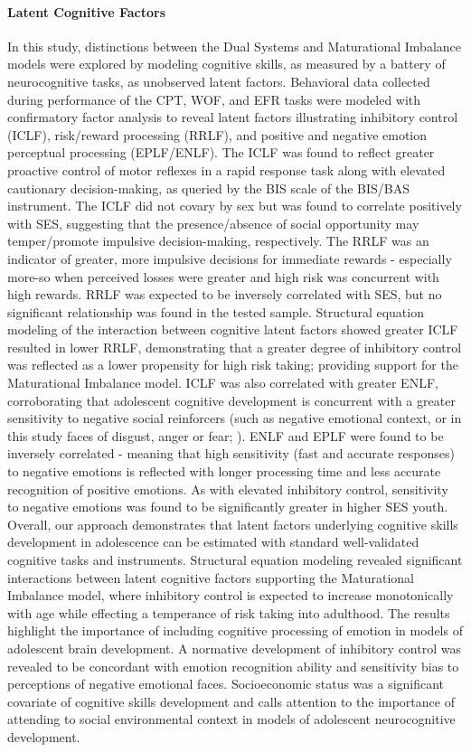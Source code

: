 \documentclass[utf8]{stylesheet}
\begin{document}
\paragraph*{Latent Cognitive Factors} In this study, distinctions between the Dual Systems and Maturational Imbalance models were explored by modeling cognitive skills, as measured by a battery of neurocognitive tasks, as unobserved latent factors. Behavioral data collected during performance of the CPT, WOF, and EFR tasks were modeled with confirmatory factor analysis to reveal latent factors illustrating inhibitory control (ICLF), risk/reward processing (RRLF), and positive and negative emotion perceptual processing (EPLF/ENLF). The ICLF was found to reflect greater proactive control of motor reflexes in a rapid response task along with elevated cautionary decision-making, as queried by the BIS scale of the BIS/BAS instrument. The ICLF did not covary by sex but was found to correlate positively with SES, suggesting that the presence/absence of social opportunity may temper/promote impulsive decision-making, respectively. The RRLF was an indicator of greater, more impulsive decisions for immediate rewards - especially more-so when perceived losses were greater and high risk was concurrent with high rewards. RRLF was expected to be inversely correlated with SES, but no significant relationship was found in the tested sample. Structural equation modeling of the interaction between cognitive latent factors showed greater ICLF resulted in lower RRLF, demonstrating that a greater degree of inhibitory control was reflected as a lower propensity for high risk taking; providing support for the Maturational Imbalance model. ICLF was also correlated with greater ENLF, corroborating that adolescent cognitive development is concurrent with a greater sensitivity to negative social reinforcers (such as negative emotional context, or in this study faces of disgust, anger or fear; \cite{jones2014adolescent, rosenbaum2020valence}). ENLF and EPLF were found to be inversely correlated - meaning that high sensitivity (fast and accurate responses) to negative emotions is reflected with longer processing time and less accurate recognition of positive emotions. As with elevated inhibitory control, sensitivity to negative emotions was found to be significantly greater in higher SES youth.
Overall, our approach demonstrates that latent factors underlying cognitive skills development in adolescence can be estimated with standard well-validated cognitive tasks and instruments. Structural equation modeling revealed significant interactions between latent cognitive factors supporting the Maturational Imbalance model, where inhibitory control is expected to increase monotonically with age while effecting a temperance of risk taking into adulthood. The results highlight the importance of including cognitive processing of emotion in models of adolescent brain development. A normative development of inhibitory control was revealed to be concordant with emotion recognition ability and sensitivity bias to perceptions of negative emotional faces. Socioeconomic status was a significant covariate of cognitive skills development and calls attention to the importance of attending to social environmental context in models of adolescent neurocognitive development.
\vspace{2pt}
\end{document}
